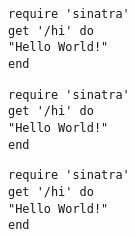 \begin{verbatim}
require 'sinatra'
get '/hi' do
"Hello World!"
end
\end{verbatim}

\begin{verbatim}
require 'sinatra'
get '/hi' do
"Hello World!"
end
\end{verbatim}

\begin{verbatim}
require 'sinatra'
get '/hi' do
"Hello World!"
end
\end{verbatim}
